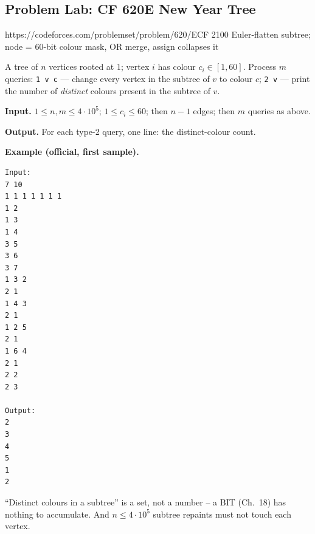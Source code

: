 \subsection{Problem Lab: CF 620E New Year Tree}

  {https://codeforces.com/problemset/problem/620/E}{CF 2100}
  {Euler-flatten subtree; node = 60-bit colour mask, OR merge, assign collapses it}

\begin{problemstatement}
A tree of \(n\) vertices rooted at \(1\); vertex \(i\) has colour \(c_i\in[1,60]\).  Process \(m\) queries: \texttt{1 v c} --- change every vertex in the subtree of \(v\) to colour \(c\); \texttt{2 v} --- print the number of \emph{distinct} colours present in the subtree of \(v\).

\textbf{Input.} \(1\le n,m\le 4\cdot10^{5}\); \(1\le c_i\le 60\); then \(n-1\) edges; then \(m\) queries as above.

\textbf{Output.} For each type-2 query, one line: the distinct-colour count.

\textbf{Example (official, first sample).}
\begin{verbatim}
Input:
7 10
1 1 1 1 1 1 1
1 2
1 3
1 4
3 5
3 6
3 7
1 3 2
2 1
1 4 3
2 1
1 2 5
2 1
1 6 4
2 1
2 2
2 3

Output:
2
3
4
5
1
2
\end{verbatim}
\end{problemstatement}

\begin{attemptgate}
``Distinct colours in a subtree'' is a set, not a number -- a BIT (Ch.~18) has nothing to accumulate.  And \(n\le 4\cdot10^5\) subtree repaints must not touch each vertex.
\end{attemptgate}

